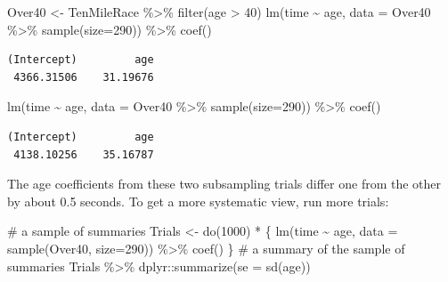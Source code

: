 \documentclass[
  letterpaper,
  DIV=11,
  numbers=noendperiod,
  oneside]{scrreprt}
\newenvironment{Shaded}{\begin{snugshade}}{\end{snugshade}}
\newcommand{\AttributeTok}[1]{\textcolor[rgb]{0.40,0.45,0.13}{#1}}
\newcommand{\CommentTok}[1]{\textcolor[rgb]{0.37,0.37,0.37}{#1}}
\newcommand{\DecValTok}[1]{\textcolor[rgb]{0.68,0.00,0.00}{#1}}
\newcommand{\FunctionTok}[1]{\textcolor[rgb]{0.28,0.35,0.67}{#1}}
\newcommand{\NormalTok}[1]{\textcolor[rgb]{0.00,0.23,0.31}{#1}}
\newcommand{\OtherTok}[1]{\textcolor[rgb]{0.00,0.23,0.31}{#1}}
\newcommand{\SpecialCharTok}[1]{\textcolor[rgb]{0.37,0.37,0.37}{#1}}
\begin{document}
\begin{Shaded}
\begin{Highlighting}[]
\NormalTok{Over40 }\OtherTok{\textless{}{-}}\NormalTok{ TenMileRace }\SpecialCharTok{\%\textgreater{}\%} \FunctionTok{filter}\NormalTok{(age }\SpecialCharTok{\textgreater{}} \DecValTok{40}\NormalTok{)}
\FunctionTok{lm}\NormalTok{(time }\SpecialCharTok{\textasciitilde{}}\NormalTok{ age, }\AttributeTok{data =}\NormalTok{ Over40 }\SpecialCharTok{\%\textgreater{}\%} \FunctionTok{sample}\NormalTok{(}\AttributeTok{size=}\DecValTok{290}\NormalTok{)) }\SpecialCharTok{\%\textgreater{}\%} \FunctionTok{coef}\NormalTok{()}
\end{Highlighting}
\end{Shaded}

\begin{verbatim}
(Intercept)         age 
 4366.31506    31.19676 
\end{verbatim}

\begin{Shaded}
\begin{Highlighting}[]
\FunctionTok{lm}\NormalTok{(time }\SpecialCharTok{\textasciitilde{}}\NormalTok{ age, }\AttributeTok{data =}\NormalTok{ Over40 }\SpecialCharTok{\%\textgreater{}\%} \FunctionTok{sample}\NormalTok{(}\AttributeTok{size=}\DecValTok{290}\NormalTok{)) }\SpecialCharTok{\%\textgreater{}\%} \FunctionTok{coef}\NormalTok{()}
\end{Highlighting}
\end{Shaded}

\begin{verbatim}
(Intercept)         age 
 4138.10256    35.16787 
\end{verbatim}

The age coefficients from these two subsampling trials differ one from
the other by about 0.5 seconds. To get a more systematic view, run more
trials:

\begin{Shaded}
\begin{Highlighting}[]
\CommentTok{\# a sample of summaries}
\NormalTok{Trials }\OtherTok{\textless{}{-}} \FunctionTok{do}\NormalTok{(}\DecValTok{1000}\NormalTok{) }\SpecialCharTok{*}\NormalTok{ \{}
  \FunctionTok{lm}\NormalTok{(time }\SpecialCharTok{\textasciitilde{}}\NormalTok{ age, }\AttributeTok{data =} \FunctionTok{sample}\NormalTok{(Over40, }\AttributeTok{size=}\DecValTok{290}\NormalTok{)) }\SpecialCharTok{\%\textgreater{}\%} \FunctionTok{coef}\NormalTok{()}
\NormalTok{\}}
\CommentTok{\# a summary of the sample of summaries}
\NormalTok{Trials }\SpecialCharTok{\%\textgreater{}\%}
\NormalTok{  dplyr}\SpecialCharTok{::}\FunctionTok{summarize}\NormalTok{(}\AttributeTok{se =} \FunctionTok{sd}\NormalTok{(age))}
\end{Highlighting}
\end{Shaded}
\end{document}
